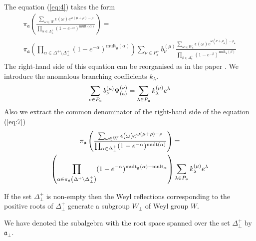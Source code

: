 \documentclass[a4paper,12pt]{article}
\theoremstyle{definition} \newtheorem{Def}{Definition}
\begin{document}
The equation (\ref{eq:4}) takes the form
\begin{multline}
  \label{eq:7}
  \pi_{\mathfrak{a}}\left(\frac{\sum_{\omega\in W} \epsilon(\omega) e^{\omega(\mu+\rho)-\rho}}{\prod_{\alpha\in\Delta^{+}_{\bot}}(1-e^{-\alpha})^{\mathrm{mult}(\alpha)}}\right) = \\
  \pi_{\mathfrak{a}}\left(\prod_{\alpha\in \Delta^{+}\setminus \Delta^{+}_{\bot}}(1-e^{-\alpha})^{\mathrm{mult}_{\mathfrak{g}}(\alpha)} \right)\sum_{\nu\in P^{+}_{\mathfrak{a}}}b^{(\mu)}_{\nu}
  \frac{\sum_{\omega\in W_{\mathfrak{a}}}\epsilon(\omega)e^{\omega(\nu+\rho_{\mathfrak{a}})-\rho_{\mathfrak{a}}}}{\prod_{\beta\in \Delta_{\mathfrak{a}}^{+}}(1-e^{-\beta})^{\mathrm{mult}_{\mathfrak{a}}(\beta)}}
\end{multline}
The right-hand side of this equation can be reorganised as in the paper \cite{ilyin812pbc}. We introduce the anomalous branching coefficients $k_{\lambda}$.
\begin{equation}
  \label{eq:10}
  \sum_{\nu \in P_{\frak{a}}}b_{\nu }^{\left( \mu \right) }\Psi _{\left( \frak{%
        a}\right) }^{\left( \nu \right) }=\sum_{\lambda \in P_{\frak{a}}}k_{\lambda
  }^{\left( \mu \right) }e^{\lambda } 
\end{equation}
Also we extract the common denominator of  the right-hand side of the equation (\ref{eq:7})
\begin{multline}
  \label{eq:12}
  \pi_{\mathfrak{a}}\left(\frac{\sum_{\omega\in W} \epsilon(\omega) e^{\omega(\mu+\rho)-\rho}}{\prod_{\alpha\in\Delta^{+}_{\bot}}(1-e^{-\alpha})^{\mathrm{mult}(\alpha)}}\right) = \\
  \left(\prod_{\alpha\in \pi_{\mathfrak{a}}\left(\Delta^{+}\setminus \Delta^{+}_{\bot}\right)}(1-e^{-\alpha})^{{\rm mult}_{\mathfrak{g}}(\alpha)-{\rm mult}_{\mathfrak{\alpha}}} \right)
    \sum_{\lambda \in P_{\frak{a}}}k_{\lambda}^{\left( \mu \right) }e^{\lambda } 
\end{multline}


If the set $\Delta^{+}_{\bot}$ is non-empty then the Weyl reflections corresponding to the positive roots of $\Delta^{+}_{\bot}$ generate a subgroup $W_{\bot}$ of Weyl group $W$. 

We have denoted the subalgebra with the root space spanned over the set $\Delta^{+}_{\bot}$ by $\mathfrak{a}_{\bot}$.
\end{document}
